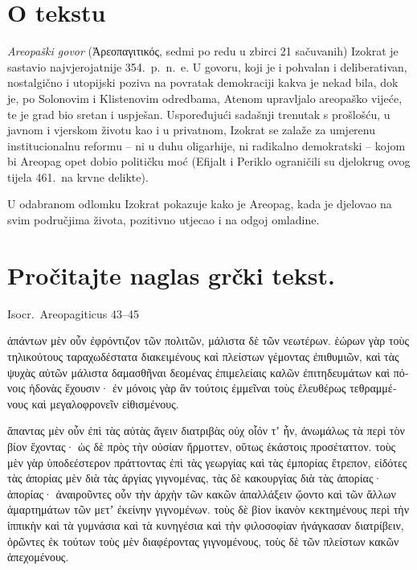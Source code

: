 


\section*{O tekstu}

\textit{Areopaški govor} (Ἀρεοπαγιτικός, sedmi po redu u zbirci 21 sačuvanih) Izokrat je sastavio najvjerojatnije 354.\ p.~n.~e. U govoru, koji je i pohvalan i deliberativan, nostalgično i utopijski poziva na povratak demokraciji kakva je nekad bila, dok je, po Solonovim i Klistenovim odredbama, Atenom upravljalo areopaško vijeće, te je grad bio sretan i uspješan. Uspoređujući sadašnji trenutak s prošlošću, u javnom i vjerskom životu kao i u privatnom, Izokrat se zalaže za umjerenu institucionalnu reformu – ni u duhu oligarhije, ni radikalno demokratski – kojom bi Areopag opet dobio političku moć (Efijalt i Periklo ograničili su djelokrug ovog tijela 461.\ na krvne delikte).

U odabranom odlomku Izokrat pokazuje kako je Areopag, kada je djelovao na svim područjima života, pozitivno utjecao i na odgoj omladine.


\section*{Pročitajte naglas grčki tekst.}

Isocr.\ Areopagiticus 43–45


\medskip


{\large

\begin{greek}

\noindent  ἁπάντων μὲν οὖν ἐφρόντιζον τῶν πολιτῶν, μάλιστα δὲ τῶν νεωτέρων. ἑώρων γὰρ τοὺς τηλικούτους ταραχωδέστατα διακειμένους καὶ πλείστων γέμοντας ἐπιθυμιῶν, καὶ τὰς ψυχὰς αὐτῶν μάλιστα δαμασθῆναι δεομένας ἐπιμελείαις καλῶν ἐπιτηδευμάτων καὶ πόνοις ἡδονὰς ἔχουσιν· ἐν μόνοις γὰρ ἂν τούτοις ἐμμεῖναι τοὺς ἐλευθέρως τεθραμμένους καὶ μεγαλοφρονεῖν εἰθισμένους.

\noindent  ἅπαντας μὲν οὖν ἐπὶ τὰς αὐτὰς ἄγειν διατριβὰς οὐχ οἷόν τʼ ἦν, ἀνωμάλως τὰ περὶ τὸν βίον ἔχοντας· ὡς δὲ πρὸς τὴν οὐσίαν ἥρμοττεν, οὕτως ἑκάστοις προσέταττον. τοὺς μὲν γὰρ ὑποδεέστερον πράττοντας ἐπὶ τὰς γεωργίας καὶ τὰς ἐμπορίας ἔτρεπον, εἰδότες τὰς ἀπορίας μὲν διὰ τὰς ἀργίας γιγνομένας, τὰς δὲ κακουργίας διὰ τὰς ἀπορίας· ἀπορίας· ἀναιροῦντες οὖν τὴν ἀρχὴν τῶν κακῶν ἀπαλλάξειν ᾤοντο καὶ τῶν ἄλλων ἁμαρτημάτων τῶν μετʼ ἐκείνην γιγνομένων. τοὺς δὲ βίον ἱκανὸν κεκτημένους περὶ τὴν ἱππικὴν καὶ τὰ γυμνάσια καὶ τὰ κυνηγέσια καὶ τὴν φιλοσοφίαν ἠνάγκασαν διατρίβειν, ὁρῶντες ἐκ τούτων τοὺς μὲν διαφέροντας γιγνομένους, τοὺς δὲ τῶν πλείστων κακῶν ἀπεχομένους.
\end{greek}

}

